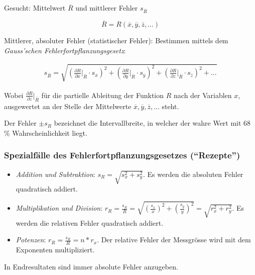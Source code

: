Gesucht: Mittelwert $\overline{R}$ und mittlerer Fehler $s_{\overline{R}}$

\begin{equation*}
    \overline{R} = R(\overline{x},\overline{y},\overline{z},...)
\end{equation*}

Mittlerer,  absoluter  Fehler  (statistischer Fehler): Bestimmen  mittels  dem
\emph{Gauss'schen Fehlerfortpflanzungsgesetz}:

\begin{gather*}
    s_{\overline{R}} = \sqrt{ \left( \frac{\partial R}{\partial x} \biggr\rvert_{\overline{R}} \cdot s_{\overline{x}}\right)^2
                            + \left( \frac{\partial R}{\partial y} \biggr\rvert_{\overline{R}} \cdot s_{\overline{y}}\right)^2
                            + \left( \frac{\partial R}{\partial z} \biggr\rvert_{\overline{R}} \cdot s_{\overline{z}}\right)^2
                            + ... }
\end{gather*}

Wobei  $\frac{\partial R}{\partial  z}  \bigr\rvert_{\overline{R}}$ f\"ur  die
partielle Ableitung  der Funktion $R$  nach der Variablen $x$,  ausgewertet an
der Stelle  der Mittelwerte  $\overline{x}, \overline{y}, \overline{z},  ... $
steht.

Der Fehler $\pm s_R$ bezeichnet die Intervallbreite, in welcher der wahre Wert
mit 68 \% Wahrscheinlichkeit liegt.

\subsubsection{Spezialf\"alle des Fehlerfortpflanzungsgesetzes (``Rezepte'')}

\begin{itemize}
    \item
        \emph{Addition  und Subtraktion}:  $s_R  =  \sqrt{s_x^2 +  s_y^2}$. Es
        werden die absoluten Fehler quadratisch addiert.
    \item
        \emph{Multiplikation   und   Division}:   $r_R   =   \frac{s_R}{R}   =
        \sqrt{(\frac{s_x}{x})^2   +   (\frac{s_y}{y})^2}   =   \sqrt{r_x^2   +
        r_y^2}$. Es werden die relativen Fehler quadratisch addiert.
    \item
        \emph{Potenzen}: $r_R = \frac{s_R}{R} =  n * r_x$. Der relative Fehler
        der Messgr\"osse wird mit dem Exponenten multipliziert.
\end{itemize}

In Endresultaten sind immer absolute Fehler anzugeben.
